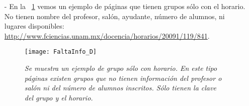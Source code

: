 \begin{itemize}
\item[-] En la \figurename{~\ref{SoloHorario}} vemos un ejemplo de páginas que tienen grupos sólo con el horario. No tienen nombre del profesor, salón, ayudante, número de alumnos, ni lugares disponibles: \url{http://www.fciencias.unam.mx/docencia/horarios/20091/119/841}. %

\begin{figure}[H]
\centering
\texttt{[image: FaltaInfo\_D]} %
\caption[\textit{Grupo sólo con horario}]{\textit{Se muestra un ejemplo de grupo sólo con horario. En este tipo páginas existen grupos que no tienen información del profesor o salón ni del número de alumnos inscritos. Sólo tienen la clave del grupo y el horario.}}\label{SoloHorario}
\end{figure}
\end{itemize}